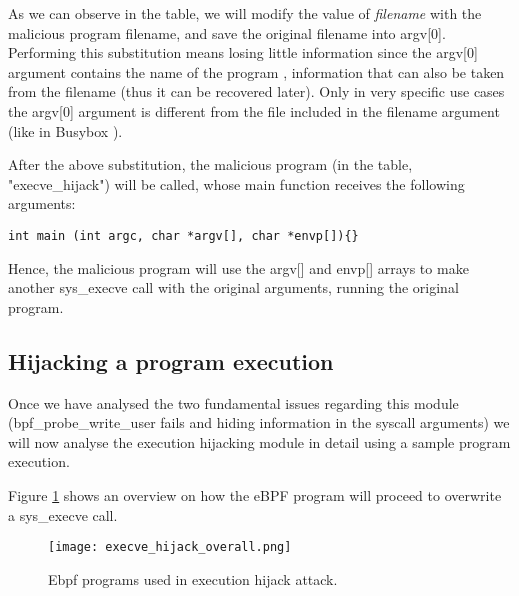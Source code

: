 As we can observe in the table, we will modify the value of \textit{filename} with the malicious program filename, and save the original filename into argv[0]. Performing this substitution means losing little information since the argv[0] argument contains the name of the program \cite{c_standard_main}, information that can also be taken from the filename (thus it can be recovered later). Only in very specific use cases the argv[0] argument is different from the file included in the filename argument (like in Busybox \cite{busybox_argv}). 

After the above substitution, the malicious program (in the table, "execve\_hijack") will be called, whose main function receives the following arguments:

\begin{verbatim}
int main (int argc, char *argv[], char *envp[]){}
\end{verbatim}

Hence, the malicious program will use the argv[] and envp[] arrays to make another sys\_execve call with the original arguments, running the original program. 

\subsection{Hijacking a program execution} \label{subsection:hijack_program_exec}
Once we have analysed the two fundamental issues regarding this module (bpf\_probe\_write\_user fails and hiding information in the syscall arguments) we will now analyse the execution hijacking module in detail using a sample program execution.

Figure \ref{fig:execve_hijack_overall} shows an overview on how the eBPF program will proceed to overwrite a sys\_execve call.

\begin{figure}[htbp]
	\centering
	\texttt{[image: execve\_hijack\_overall.png]}
	\caption{Ebpf programs used in execution hijack attack.}
	\label{fig:execve_hijack_overall}
\end{figure}

